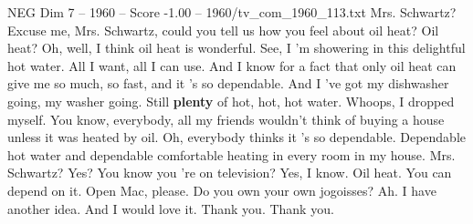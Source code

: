 \begin{textsample}{NEG Dim 7 – 1960 – Score -1.00 – 1960/tv\_com\_1960\_113.txt}  \label{ex:f7_neg_068}
Mrs.
Schwartz?
Excuse me, Mrs.
Schwartz, could you tell us how you feel about oil heat?
Oil heat?
Oh, well, I think oil heat is wonderful.
See, I 'm showering in this delightful hot water.
All I want, all I can use.
And I know for a fact that only oil heat can give me so much, so fast, and it 's so dependable.
And I 've got my dishwasher going, my washer going.
Still \textbf{plenty} of hot, hot, hot water.
Whoops, I dropped myself.
You know, everybody, all my friends wouldn't think of buying a house unless it was heated by oil.
Oh, everybody thinks it 's so dependable.
Dependable hot water and dependable comfortable heating in every room in my house.
Mrs.
Schwartz?
Yes?
You know you 're on television?
Yes, I know.
Oil heat.
You can depend on it.
Open Mac, please.
Do you own your own jogoisses?
Ah.
I have another idea.
And I would love it.
Thank you.
Thank you.

\end{textsample}
